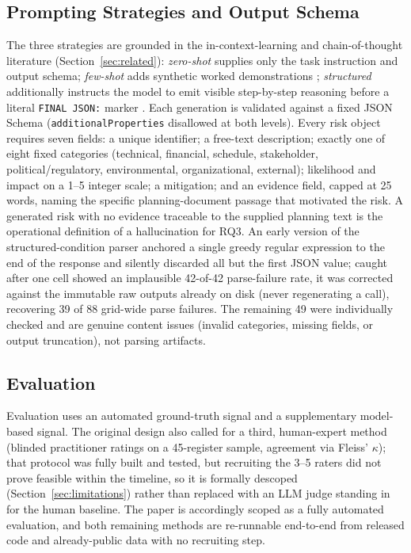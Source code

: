 \documentclass[10pt, conference, letterpaper]{IEEEtran}
\begin{document}
\subsection{Prompting Strategies and Output Schema}
The three strategies are grounded in the in-context-learning and
chain-of-thought literature (Section~\ref{sec:related}): \emph{zero-shot}
supplies only the task instruction and output schema; \emph{few-shot} adds
synthetic worked demonstrations \cite{brown2020fewshot}; \emph{structured}
additionally instructs the model to emit visible step-by-step reasoning
before a literal \texttt{FINAL JSON:} marker \cite{wei2022cot}. Each
generation is validated against a fixed JSON Schema
(\texttt{additionalProperties} disallowed at both levels). Every risk
object requires seven fields: a unique identifier; a free-text description;
exactly one of eight fixed categories (technical, financial, schedule,
stakeholder, political/regulatory, environmental, organizational,
external); likelihood and impact on a 1--5 integer scale; a mitigation; and
an evidence field, capped at 25 words, naming the specific
planning-document passage that motivated the risk. A generated risk with no
evidence traceable to the supplied planning text is the operational
definition of a hallucination for RQ3. An early version of the
structured-condition parser anchored a single greedy regular expression to
the end of the response and silently discarded all but the first JSON
value; caught after one cell showed an implausible 42-of-42
parse-failure rate, it was corrected against the immutable raw outputs
already on disk (never regenerating a call), recovering 39 of 88 grid-wide
parse failures. The remaining 49 were individually checked and are genuine
content issues (invalid categories, missing fields, or output truncation),
not parsing artifacts.

\subsection{Evaluation}
Evaluation uses an automated ground-truth signal and a supplementary
model-based signal. The original design also called for a third,
human-expert method (blinded practitioner ratings on a 45-register sample,
agreement via Fleiss' $\kappa$); that protocol was fully built and tested,
but recruiting the 3--5 raters did not prove feasible within the timeline,
so it is formally descoped (Section~\ref{sec:limitations}) rather than
replaced with an LLM judge standing in for the human baseline. The paper is
accordingly scoped as a fully automated evaluation, and both remaining
methods are re-runnable end-to-end from released code and already-public
data with no recruiting step.
\end{document}
